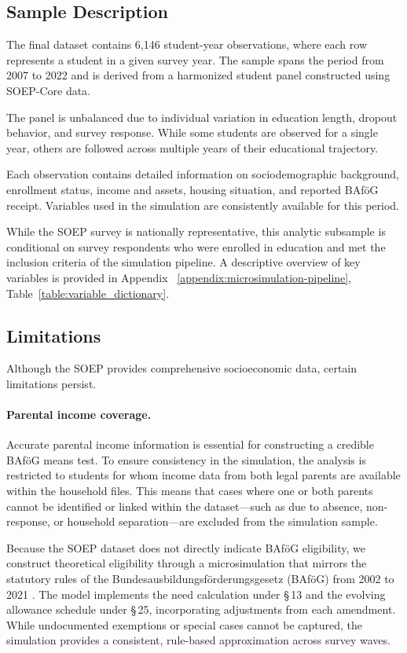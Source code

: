 \subsection{Sample Description}
The final dataset contains 6,146 student-year observations, where each row represents a student in a given survey year. 
The sample spans the period from 2007 to 2022 and is derived from a harmonized student panel constructed using SOEP-Core data.

The panel is unbalanced due to individual variation in education length, dropout behavior, and survey response. 
While some students are observed for a single year, others are followed across multiple years of their educational trajectory.

Each observation contains detailed information on sociodemographic background, enrollment status, income and assets, housing situation, and reported BAföG receipt. Variables used in the simulation are consistently available for this period.

While the SOEP survey is nationally representative, this analytic subsample is conditional on survey respondents who were enrolled in education and met the inclusion criteria of the simulation pipeline. 
A descriptive overview of key variables is provided in Appendix ~\ref{appendix:microsimulation-pipeline}, Table~\ref{table:variable_dictionary}.

\subsection{Limitations}

Although the SOEP provides comprehensive socioeconomic data, certain limitations persist.

\paragraph{Parental income coverage.}
Accurate parental income information is essential for constructing a credible BAföG means test. 
To ensure consistency in the simulation, the analysis is restricted to students for whom income data from both legal parents are available within the household files. 
This means that cases where one or both parents cannot be identified or linked within the dataset—such as due to absence, non-response, or household separation—are excluded from the simulation sample.

Because the SOEP dataset does not directly indicate BAföG eligibility, we construct theoretical eligibility through a microsimulation that mirrors the statutory rules of the Bundesausbildungsförderungsgesetz (BAföG) from 2002 to 2021 \citep{bafoeg_law,bafoeg20,bafoeg21,bafoeg22,bafoeg23,bafoeg24,bafoeg25,bafoeg26,bafoeg27,bafoeg28,bafoeg29}. 
The model implements the need calculation under §\,13 and the evolving allowance schedule under §\,25, incorporating adjustments from each amendment. 
While undocumented exemptions or special cases cannot be captured, the simulation provides a consistent, rule-based approximation across survey waves.

